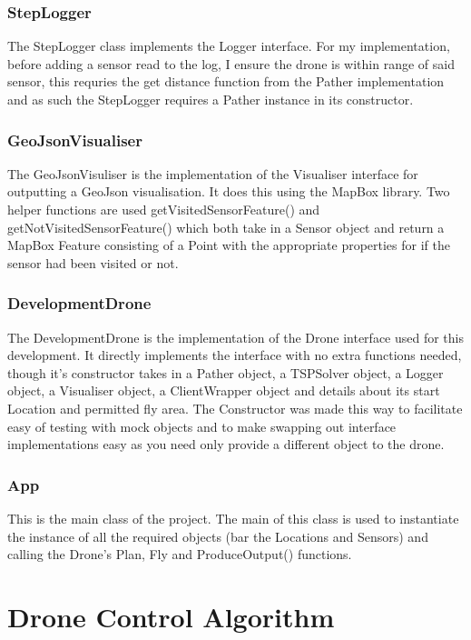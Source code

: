\documentclass[12pt]{article}
\begin{document}
\subsubsection{StepLogger}
The StepLogger class implements the Logger interface. For my implementation, before adding a sensor read to the log, I ensure the drone is within range of said sensor, this requries the get distance function from the Pather implementation and as such the StepLogger requires a Pather instance in its constructor.
\subsubsection{GeoJsonVisualiser}
The GeoJsonVisuliser is the implementation of the Visualiser interface for outputting a GeoJson visualisation. It does this using the MapBox library. Two helper functions are used getVisitedSensorFeature() and getNotVisitedSensorFeature() which both take in a Sensor object and return a MapBox Feature consisting of a Point with the appropriate properties for if the sensor had been visited or not.
\subsubsection{DevelopmentDrone}
The DevelopmentDrone is the implementation of the Drone interface used for this development. It directly implements the interface with no extra functions needed, though it's constructor takes in a Pather object, a TSPSolver object, a Logger object, a Visualiser object, a ClientWrapper object and details about its start Location and permitted fly area. The Constructor was made this way to facilitate easy of testing with mock objects and to make swapping out interface implementations easy as you need only provide a different object to the drone.
\subsubsection{App}
This is the main class of the project. The main of this class is used to instantiate the instance of all the required objects (bar the Locations and Sensors) and calling the Drone's Plan, Fly and ProduceOutput() functions.
\section{Drone Control Algorithm}
\end{document}
